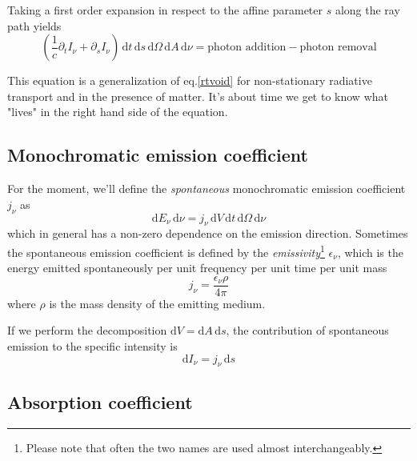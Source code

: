 \par Taking a first order expansion in respect to the affine parameter $s$ along the ray path yields
\begin{equation*}
	\left(\frac{1}{c}\partial_{t}I_{\nu}+\partial_{s}I_{\nu}\right)\, \text{d}t \, \text{d}s\, \text{d}\Omega \, \text{d}A \, \text{d}\nu = \text{photon addition}-\text{photon removal}
\end{equation*}
\par This equation is a generalization of eq.\ref{rtvoid} for non-stationary radiative transport and in the presence of matter. It's about time we get to know what "lives" in the right hand side of the equation.

\subsection{Monochromatic emission coefficient}

For the moment, we'll define the \emph{spontaneous} monochromatic emission coefficient $j_{\nu}$ as
\begin{equation}
	\text{d}E_{\nu}\,\text{d}\nu = j_{\nu}\,\text{d}V\,\text{d}t \, \text{d}\Omega \, \text{d}\nu
	\label{eq:jnu}
\end{equation}
which in general has a non-zero dependence on the emission direction. Sometimes the spontaneous emission coefficient is defined by the \emph{emissivity}\footnote{Please note that often the two names are used almost interchangeably.} $\epsilon_{\nu}$, which is the energy emitted spontaneously per unit frequency per unit time per unit mass
\begin{equation*}
	j_{\nu} = \frac{\epsilon_{\nu}\rho}{4\pi}
\end{equation*}
where $\rho$ is the mass density of the emitting medium.
\par If we perform the decomposition $\text{d}V = \text{d}A\,\text{d}s$, the contribution of spontaneous emission to the specific intensity is
\begin{equation*}
	\text{d}I_{\nu} = j_{\nu}\,\text{d}s
\end{equation*}

\subsection{Absorption coefficient}

